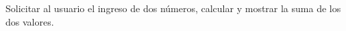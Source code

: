 Solicitar al usuario el ingreso de dos n\'umeros, calcular y mostrar la suma de los dos valores.



\volverindice
\newpage
